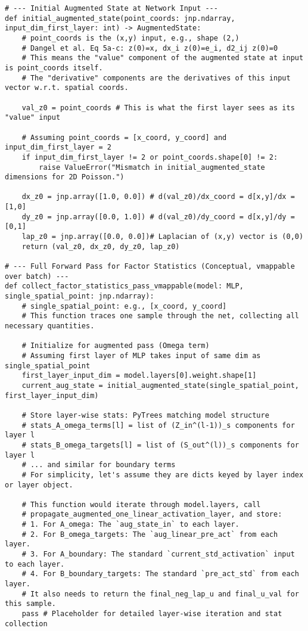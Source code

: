 \documentclass[12pt,a4paper]{article}
\begin{document}
\begin{lstlisting}[caption={Further conceptual details for KFAC in JAX + Equinox.},label=lst:kfac_jax_conceptual]
# --- Initial Augmented State at Network Input ---
def initial_augmented_state(point_coords: jnp.ndarray, input_dim_first_layer: int) -> AugmentedState:
    # point_coords is the (x,y) input, e.g., shape (2,)
    # Dangel et al. Eq 5a-c: z(0)=x, dx_i z(0)=e_i, d2_ij z(0)=0
    # This means the "value" component of the augmented state at input is point_coords itself.
    # The "derivative" components are the derivatives of this input vector w.r.t. spatial coords.
    
    val_z0 = point_coords # This is what the first layer sees as its "value" input
    
    # Assuming point_coords = [x_coord, y_coord] and input_dim_first_layer = 2
    if input_dim_first_layer != 2 or point_coords.shape[0] != 2:
        raise ValueError("Mismatch in initial_augmented_state dimensions for 2D Poisson.")
        
    dx_z0 = jnp.array([1.0, 0.0]) # d(val_z0)/dx_coord = d[x,y]/dx = [1,0]
    dy_z0 = jnp.array([0.0, 1.0]) # d(val_z0)/dy_coord = d[x,y]/dy = [0,1]
    lap_z0 = jnp.array([0.0, 0.0])# Laplacian of (x,y) vector is (0,0)
    return (val_z0, dx_z0, dy_z0, lap_z0)

# --- Full Forward Pass for Factor Statistics (Conceptual, vmappable over batch) ---
def collect_factor_statistics_pass_vmappable(model: MLP, single_spatial_point: jnp.ndarray):
    # single_spatial_point: e.g., [x_coord, y_coord]
    # This function traces one sample through the net, collecting all necessary quantities.
    
    # Initialize for augmented pass (Omega term)
    # Assuming first layer of MLP takes input of same dim as single_spatial_point
    first_layer_input_dim = model.layers[0].weight.shape[1]
    current_aug_state = initial_augmented_state(single_spatial_point, first_layer_input_dim)
    
    # Store layer-wise stats: PyTrees matching model structure
    # stats_A_omega_terms[l] = list of (Z_in^(l-1))_s components for layer l
    # stats_B_omega_targets[l] = list of (S_out^(l))_s components for layer l
    # ... and similar for boundary terms
    # For simplicity, let's assume they are dicts keyed by layer index or layer object.
    
    # This function would iterate through model.layers, call 
    # propagate_augmented_one_linear_activation_layer, and store:
    # 1. For A_omega: The `aug_state_in` to each layer.
    # 2. For B_omega_targets: The `aug_linear_pre_act` from each layer.
    # 3. For A_boundary: The standard `current_std_activation` input to each layer.
    # 4. For B_boundary_targets: The standard `pre_act_std` from each layer.
    # It also needs to return the final_neg_lap_u and final_u_val for this sample.
    pass # Placeholder for detailed layer-wise iteration and stat collection


\end{lstlisting}
\end{document}
